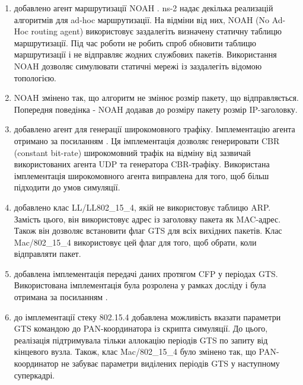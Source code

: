 \documentclass[a4paper,ukrainian,utf8,nocolumnsxix,floatsection,equationsection]{eskdtext}
\begin{document}
\begin{enumerate}
	\item добавлено агент маршрутизації NOAH \cite{ns2:noah}. ns-2 надає декілька реализацій алгоритмів для ad-hoc маршрутизації. На відміни від них, NOAH (No Ad-Hoc routing agent) використовує заздалегіть визначену статичну таблицю маршрутизації. Під час роботи не робить спроб обновити таблицю маршрутизації і не відправляє жодних службових пакетів. Використання NOAH дозволяє симулювати статичні мережі із заздалегіть відомою топологією.

	\item NOAH змінено так, що алгоритм не змінює розмір пакету, що відправляється. Попередня поведінка - NOAH додавав до розміру пакету розмір IP-заголовку. 

	\item добавлено агент для генерації широкомовного трафіку. Імплементацію агента отримано за посиланням \cite{ns2:broadcastapp}. Ця імплементація дозволяє генерировати CBR (constant bit-rate) широкомовний трафік на відміну від зазвичай використованих агента UDP та генератора CBR-трафіку. Використана імплементація широкомовного агента виправлена для того, щоб більш підходити до умов симуляції.
	

	\item добавлено клас LL/LL802\_15\_4, якій не використовує таблицю ARP. Замість цього, він використовує адрес із заголовку пакета як MAC-адрес. Також він дозволяє встановити флаг GTS для всіх вихідних пакетів. Клас Mac/802\_15\_4 використовує цей флаг для того, щоб обрати, коли відправляти пакет. 

	\item добавлена імплементація передачі даних протягом CFP у періодах GTS. Використована імплементація була розролена у рамках досліду \cite{ns2:with:cfp} і була отримана за посиланням \cite{ns2:with:cfp:sources}.

	\item до імплементації стеку 802.15.4 добавлена можливість вказати параметри GTS командою до PAN-координатора із скрипта симуляції. До цього, реалізація підтримувала тільки аллокацію періодів GTS по запиту від кінцевого вузла. Також, клас Mac/802\_15\_4 було змінено так, що PAN-координатор не забуває параметри виділених періодів GTS у наступному суперкадрі.


\end{enumerate}
\end{document}
